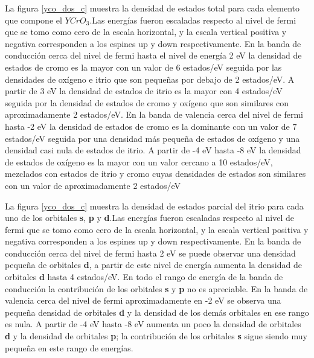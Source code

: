 \noindent La figura \ref{yco_dos_c}  muestra la densidad de 
estados total para 
cada 
elemento que compone el $YCrO_{3}$.Las energ\'ias fueron escaladas 
respecto al 
nivel de fermi que se tomo como cero de la escala horizontal, y la 
escala 
vertical positiva y negativa corresponden a los espines up y down 
respectivamente. En la banda de conducci\'on cerca del nivel de fermi 
hasta el nivel de energ\'ia 2 eV la densidad de estados de cromo es la 
mayor con un valor de 6 estados/eV seguida por las densidades de 
ox\'igeno e itrio que son peque\~nas por debajo de 2 estados/eV. A 
partir de 3 eV la densidad de estados de itrio es la mayor con 4 
estados/eV seguida por la densidad de estados de cromo y ox\'igeno que 
son similares con aproximadamente 2 estados/eV. En la banda de 
valencia cerca del nivel de fermi hasta -2 eV la densidad de estados 
de cromo es la dominante con un valor de 7 estados/eV seguida por una 
densidad m\'as peque\~na de estados de ox\'igeno y una densidad casi 
nula de estados de itrio. A partir de -4 eV hasta -8 eV la densidad de 
estados de ox\'igeno es la mayor con un valor cercano a 10 estados/eV, 
mezclados con estados de itrio y cromo cuyas densidades de estados son 
similares con un valor de aproximadamente 2 estados/eV


\noindent La figura \ref{yco_dos_c}  muestra la densidad de 
estados parcial del 
itrio para 
cada 
uno de los orbitales \textbf{s}, \textbf{p} y \textbf{d}.Las 
energ\'ias fueron escaladas 
respecto al 
nivel de fermi que se tomo como cero de la escala horizontal, y la 
escala 
vertical positiva y negativa corresponden a los espines up y down 
respectivamente. En la banda de conducci\'on cerca del nivel de fermi 
hasta 2 eV se puede observar una densidad peque\~na de orbitales 
\textbf{d}, a partir de este nivel de energ\'ia aumenta la densidad de 
orbitales \textbf{d} hasta 4 estados/eV. En todo el rango de energ\'ia 
de la banda de conducci\'on la contribuci\'on de los orbitales 
\textbf{s} y \textbf{p} no es apreciable. En la banda de valencia 
cerca del nivel de fermi aproximadamente en -2
 eV se observa una peque\~na densidad de orbitales \textbf{d} y la 
 densidad de los dem\'as orbitales en ese rango es nula. A partir de 
 -4 eV hasta -8 eV aumenta un poco la densidad de orbitales \textbf{d} 
 y la densidad de orbitales \textbf{p}; la contribuci\'on de los 
 orbitales \textbf{s} sigue siendo muy peque\~na en este rango de 
 energ\'ias.
 
 
 
